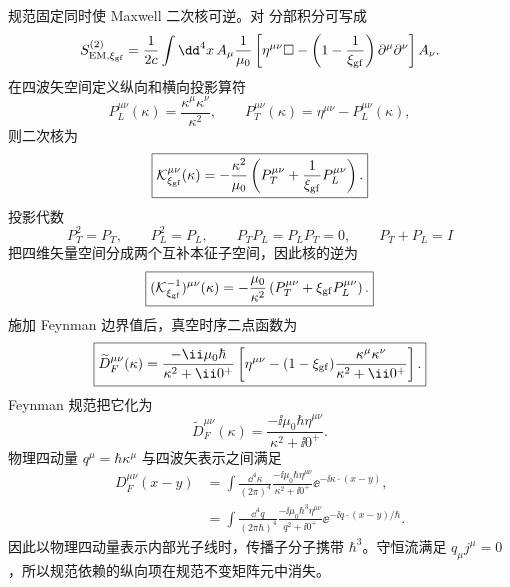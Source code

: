 规范固定同时使 Maxwell 二次核可逆。对 分部积分可写成
\begin{equation}
 S_{\rm EM,\xi_{\rm gf}}^{(2)}
 =\frac1{2c}\int\dd^4 x\,
 A_\mu\frac1{\mu_0}
 \left[
 \eta^{\mu\nu}\Box
 -\left(1-\frac1{\xi_{\rm gf}}\right)
 \partial^\mu\partial^\nu
 \right]A_\nu.
 \label{eq:maxwell-gf-quadratic-r6}
\end{equation}
在四波矢空间定义纵向和横向投影算符
\begin{equation*}
 P_L^{\mu\nu}(\kappa)=\frac{\kappa^\mu\kappa^\nu}{\kappa^2},
 \qquad
 P_T^{\mu\nu}(\kappa)=\eta^{\mu\nu}-P_L^{\mu\nu}(\kappa),
\end{equation*}
则二次核为
\begin{equation}
 \boxed{
 \mathcal K_{\xi_{\rm gf}}^{\mu\nu}(\kappa)
 =-\frac{\kappa^2}{\mu_0}
 \left(P_T^{\mu\nu}+\frac1{\xi_{\rm gf}}P_L^{\mu\nu}\right).}
 \label{eq:maxwell-kernel-projectors-r6}
\end{equation}
投影代数
\begin{equation}
 P_T^2=P_T,
 \qquad
 P_L^2=P_L,
 \qquad
 P_TP_L=P_LP_T=0,
 \qquad
 P_T+P_L=I
 \label{eq:maxwell-projector-algebra-r13}
\end{equation}
把四维矢量空间分成两个互补本征子空间，因此核的逆为
\begin{equation}
 \boxed{
 (\mathcal K_{\xi_{\rm gf}}^{-1})^{\mu\nu}(\kappa)
 =-\frac{\mu_0}{\kappa^2}
 \left(P_T^{\mu\nu}+\xi_{\rm gf}P_L^{\mu\nu}\right).}
 \label{eq:maxwell-kernel-inverse-r6}
\end{equation}
施加 Feynman 边界值后，真空时序二点函数为
\begin{equation}
 \boxed{
 \widetilde D_F^{\mu\nu}(\kappa)
 =\frac{-\ii\mu_0\hbar}{\kappa^2+\ii0^+}
 \left[
 \eta^{\mu\nu}-(1-\xi_{\rm gf})
 \frac{\kappa^\mu\kappa^\nu}{\kappa^2+\ii0^+}
 \right].}
 \label{eq:photon-prop-xi-r2}
\end{equation}
Feynman 规范把它化为
\begin{equation}
 \boxed{
 \widetilde D_F^{\mu\nu}(\kappa)
 =\frac{-\ii\mu_0\hbar\eta^{\mu\nu}}
 {\kappa^2+\ii0^+}.}
 \label{eq:photon-prop-feynman-r2}
\end{equation}
物理四动量 $q^\mu=\hbar\kappa^\mu$ 与四波矢表示之间满足
\begin{equation}
 \boxed{
 \begin{aligned}
 D_F^{\mu\nu}(x-y)
 &=\int\frac{\dd^4 \kappa}{(2\pi)^4}
 \frac{-\ii\mu_0\hbar\eta^{\mu\nu}}
 {\kappa^2+\ii0^+}\ee^{-\ii\kappa\cdot(x-y)},\\
 &=\int\frac{\dd^4 q}{(2\pi\hbar)^4}
 \frac{-\ii\mu_0\hbar^3\eta^{\mu\nu}}
 {q^2+\ii0^+}\ee^{-\ii q\cdot(x-y)/\hbar}.
 \end{aligned}}
 \label{eq:photon-prop-kappa-to-q-r13}
\end{equation}
因此以物理四动量表示内部光子线时，传播子分子携带 $\hbar^3$。守恒流满足 $q_\mu j^\mu=0$，所以规范依赖的纵向项在规范不变矩阵元中消失。

